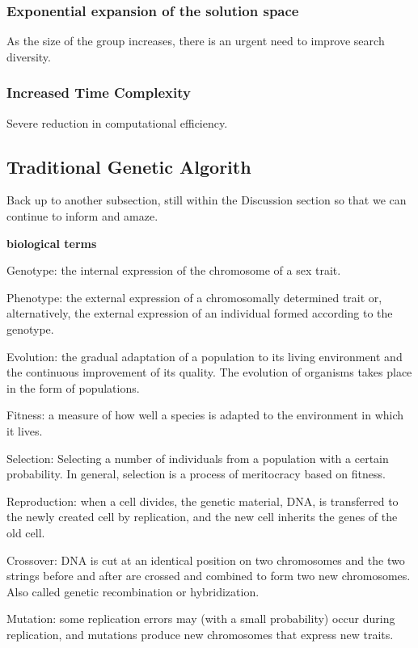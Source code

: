 \documentclass[twocolumn]{article}
\begin{document}
\subsubsection{Exponential expansion of the solution space}

As the size of the group increases, there is an urgent need to improve
search diversity.

\subsubsection{Increased Time Complexity}
Severe reduction in computational efficiency.


\subsection{Traditional Genetic Algorith}
\label{subsec:other}
Back up to another subsection, still within the Discussion section so
that we can continue to inform and amaze.


\textbf{biological terms}

	Genotype: the internal expression of the chromosome of a sex trait.

	Phenotype: the external expression of a chromosomally determined trait
	or, alternatively, the external expression of an individual formed
	according to the genotype.

	Evolution: the gradual adaptation of a population to its living
	environment and the continuous improvement of its quality. The
	evolution of organisms takes place in the form of populations.

	Fitness: a measure of how well a species is adapted to the
	environment in which it lives.

	Selection: Selecting a number of individuals from a population with a
	certain probability. In general, selection is a process of meritocracy
	based on fitness.

	Reproduction: when a cell divides, the genetic material, DNA, is
	transferred to the newly created cell by replication, and the new cell
	inherits the genes of the old cell.

	Crossover: DNA is cut at an identical position on two chromosomes and
	the two strings before and after are crossed and combined to form two
	new chromosomes. Also called genetic recombination or hybridization.
	
	Mutation: some replication errors may (with a small probability) occur
	during replication, and mutations produce new chromosomes that express
	new traits.
\end{document}
